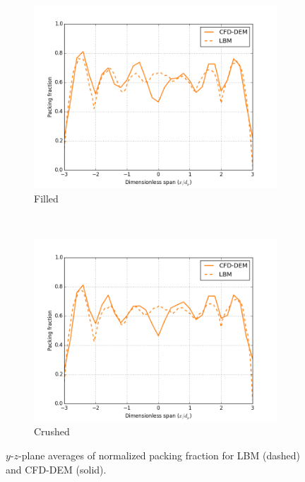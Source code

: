 \begin{figure}[!ht]
    \centering
    \begin{subfigure}[b]{0.44\textwidth}
        \includegraphics[width = \textwidth]{figures/lbm/y-phi-profiles-filled-cfd-dem}
        \caption{Filled}\label{fig:lbm-cfd-dem-phi-filled}
    \end{subfigure}
    ~
    \begin{subfigure}[b]{0.44\textwidth}
        \includegraphics[width = \textwidth]{figures/lbm/y-phi-profiles-crushed-cfd-dem}
        \caption{Crushed}\label{fig:lbm-cfd-dem-phi-crushed}
    \end{subfigure}
    \caption{$y$-$z$-plane averages of normalized packing fraction for LBM (dashed) and CFD-DEM (solid).}\label{fig:lbm-cfd-dem-phi}
\end{figure}









